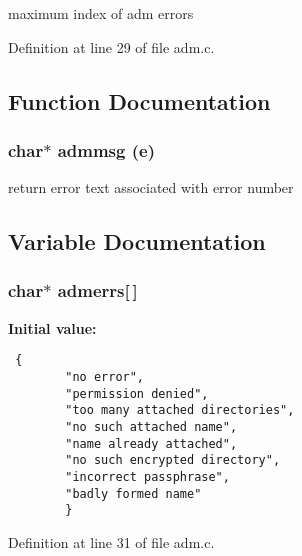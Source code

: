 maximum index of adm errors 

Definition at line 29 of file adm.c.

\subsection{Function Documentation}
\subsubsection{\setlength{\rightskip}{0pt plus 5cm}char$\ast$ admmsg (e)}\label{adm_8c_a2}


return error text associated with error number 

\subsection{Variable Documentation}
\subsubsection{\setlength{\rightskip}{0pt plus 5cm}char$\ast$ {\bf admerrs}[$\,$]}\label{adm_8c_a1}


{\bf Initial value:}

\footnotesize\begin{verbatim} {
        "no error",                     
        "permission denied",            
        "too many attached directories",
        "no such attached name",        
        "name already attached",        
        "no such encrypted directory",  
        "incorrect passphrase",         
        "badly formed name"             
        }
\end{verbatim}\normalsize 


Definition at line 31 of file adm.c.